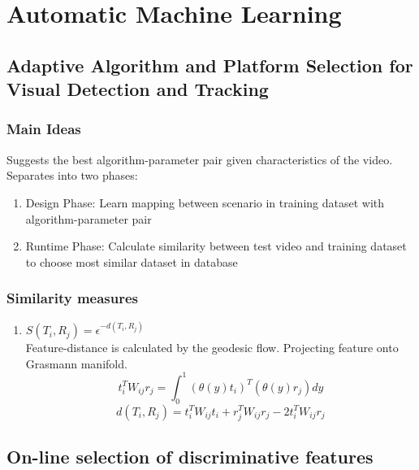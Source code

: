 \chapter{Automatic Machine Learning}

\section{Adaptive Algorithm and Platform Selection for Visual Detection
and Tracking}

\subsection{Main Ideas}

Suggests the best algorithm-parameter pair given characteristics of the
video. Separates into two phases:

\begin{enumerate}
  \item Design Phase: Learn mapping between scenario in
    training dataset with algorithm-parameter pair
  \item Runtime Phase: Calculate similarity
    between test video and training dataset to
    choose most similar dataset in database
\end{enumerate}

\subsection{Similarity measures}

\begin{enumerate}
  \item $S(T_i,R_j) =
    \epsilon^{-d(T_i,R_j)}$
    \\
    Feature-distance
    is calculated
    by the
    geodesic flow.
    Projecting
    feature onto
    Grasmann
    manifold.
    \begin{equation}
      t_i^{T}W_{ij}r_{j}
      =
      \int_{0}^{1}
      (\theta(y)t_i)^T
      (\theta(y)r_j)
      dy
    \end{equation}
    \begin{equation}
      d(T_i,R_j)
      =
      t_i^{T}W_{ij}t_i
      +
      r_j^{T}W_{ij}r_j
      -
      2t_i^{T}W_{ij}r_j
    \end{equation}

\end{enumerate}

\section{On-line
selection
of
discriminative
features
\cite{collins2005online}}

